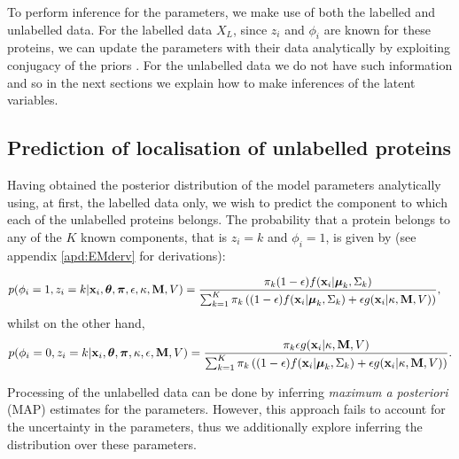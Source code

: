 \documentclass[12pt,english]{article}\usepackage[]{graphicx}\usepackage[]{color}
\begin{document}
To perform inference for the parameters, we make use of both the
labelled and unlabelled data. For the labelled data $X_L$, since $z_i$
and $\phi_i$ are known for these proteins, we can update the
parameters with their data analytically by exploiting conjugacy of the
priors \citep[see, for example,][]{Gelman:1995}. For the unlabelled
data we do not have such information and so in the next sections we
explain how to make inferences of the latent variables.

\subsection{Prediction of localisation of unlabelled proteins}

Having obtained the posterior distribution of the model parameters
analytically using, at first, the labelled data only, we wish to
predict the component to which each of the unlabelled proteins
belongs. The probability that a protein belongs to any of the $K$
known components, that is $z_i = k$ and $\phi_i = 1$, is given by (see
appendix \ref{apd:EMderv} for derivations):

\begin{equation}\label{equation::estep1}
\begin{split}
p(\phi_i = 1, z_i = k|{\bf x}_i, \boldsymbol{\theta}, \boldsymbol{\pi} , \epsilon,\kappa, {\bf M}, V)  & = \frac{\pi_k(1-\epsilon)f({\bf x}_i|\boldsymbol{\mu}_k, \Sigma_{k})}{\sum_{k=1}^{K}\pi_k\left((1-\epsilon) f({\bf x}_i|\boldsymbol{\mu}_k, \Sigma_k) + \epsilon g({\bf x}_i|\kappa, {\bf M}, V)\right)},
\end{split}
\end{equation}
whilst on the other hand,
\begin{equation}\label{equation::estep2}
\begin{split}
p(\phi_i = 0, z_i = k|{\bf x}_i, \boldsymbol{\theta}, \boldsymbol{\pi},\kappa, \epsilon, {\bf M}, V)  = \frac{\pi_k \epsilon g({\bf x}_i|\kappa, {\bf M}, V)}{\sum_{k=1}^{K}\pi_k\left((1-\epsilon) f({\bf x}_i|\boldsymbol{\mu}_k, \Sigma_k) + \epsilon g({\bf x}_i|\kappa, {\bf M}, V)\right)}.
\end{split}
\end{equation}

Processing of the unlabelled data can be done by inferring {\em maximum
  a posteriori} (MAP) estimates for the parameters. However, this
approach fails to account for the uncertainty in the parameters, thus
we additionally explore inferring the distribution over these
parameters.
\end{document}
